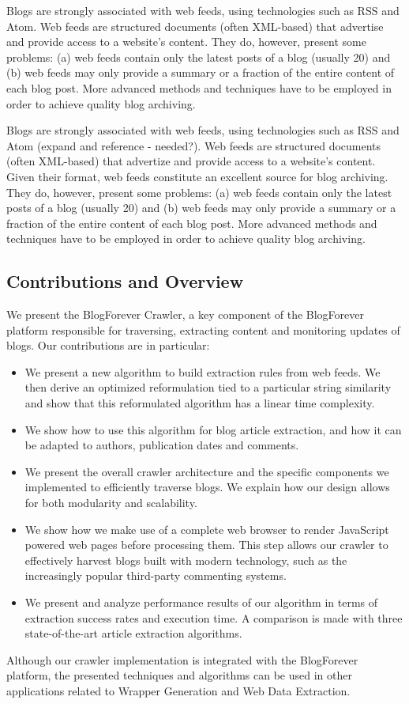Blogs are strongly associated with web feeds, using technologies such as RSS and Atom. Web feeds are structured documents (often XML-based) that advertise and provide access to a website's content. 
They do, however, present some problems:
(a) web feeds contain only the latest posts of a blog (usually 20) and
(b) web feeds may only provide a summary or a fraction of the entire content of each blog post. More advanced methods and techniques have to be employed in order to achieve quality blog archiving.


Blogs are strongly associated with web feeds, using technologies such as RSS and Atom (expand and reference - needed?). Web feeds are structured documents (often XML-based) that advertize and provide access to a website's content. Given their format, web feeds constitute an excellent source for blog archiving. They do, however, present some problems: (a) web feeds contain only the latest posts of a blog (usually 20) and (b) web feeds may only provide a summary or a fraction of the entire content of each blog post. More advanced methods and techniques have to be employed in order to achieve quality blog archiving.


\subsection{Contributions and Overview}
We present the BlogForever Crawler, a key component of the BlogForever platform responsible for traversing, extracting content and monitoring updates of blogs. Our contributions are in particular:

\begin{itemize}
  \item We present a new algorithm to build extraction rules from web feeds. We then derive an optimized reformulation tied to a particular string similarity and show that this reformulated algorithm has a linear time complexity.
  \item We show how to use this algorithm for blog article extraction, and how it can be adapted to authors, publication dates and comments.
  \item We present the overall crawler architecture and the specific components we implemented to efficiently traverse blogs. We explain how our design allows for both modularity and scalability.
  \item We show how we make use of a complete web browser to render JavaScript powered web pages before processing them. This step allows our crawler to effectively harvest blogs built with modern technology, such as the increasingly popular third-party commenting systems.
  \item We present and analyze performance results of our algorithm in terms of extraction success rates and execution time. A comparison is made with three state-of-the-art article extraction algorithms.
\end{itemize}

Although our crawler implementation is integrated with the BlogForever platform, the presented techniques and algorithms can be used in other applications related to Wrapper Generation and Web Data Extraction.
